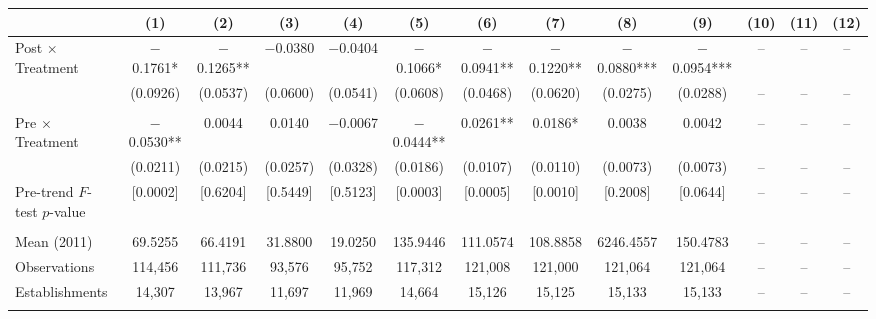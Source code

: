 \documentclass[12pt,letterpaper]{article}
\begin{document}
\begin{table}[]
\begin{threeparttable}
\begin{tabular}{lcccccccccccc}
 & (1) & (2) & (3) & (4) & (5) & (6) & (7) & (8) & (9) & (10) & (11) & (12) \\
\midrule
Post $\times$ Treatment & $-$0.1761* & $-$0.1265** & $-$0.0380 & $-$0.0404 & $-$0.1066* & $-$0.0941** & $-$0.1220** & $-$0.0880*** & $-$0.0954*** & -- & -- & -- \\
  & (0.0926) & (0.0537) & (0.0600) & (0.0541) & (0.0608) & (0.0468) & (0.0620) & (0.0275) & (0.0288) & -- & -- & -- \\
  &  &  &  &  &  &  &  &  &  &  &  & \\
Pre $\times$ Treatment & $-$0.0530** & 0.0044 & 0.0140 & $-$0.0067 & $-$0.0444** & 0.0261** & 0.0186* & 0.0038 & 0.0042 & -- & -- & -- \\
  & (0.0211) & (0.0215) & (0.0257) & (0.0328) & (0.0186) & (0.0107) & (0.0110) & (0.0073) & (0.0073) & -- & -- & -- \\
Pre-trend $F$-test $p$-value & [0.0002] & [0.6204] & [0.5449] & [0.5123] & [0.0003] & [0.0005] & [0.0010] & [0.2008] & [0.0644] & -- & -- & -- \\
  &  &  &  &  &  &  &  &  &  &  &  & \\
Mean (2011) & 69.5255 & 66.4191 & 31.8800 & 19.0250 & 135.9446 & 111.0574 & 108.8858 & 6246.4557 & 150.4783 & -- & -- & -- \\
Observations & 114{,}456 & 111{,}736 & 93{,}576 & 95{,}752 & 117{,}312 & 121{,}008 & 121{,}000 & 121{,}064 & 121{,}064 & -- & -- & -- \\
Establishments & 14{,}307 & 13{,}967 & 11{,}697 & 11{,}969 & 14{,}664 & 15{,}126 & 15{,}125 & 15{,}133 & 15{,}133 & -- & -- & -- \\
  &  &  &  &  &  &  &  &  &  &  &  & \\
\midrule

\end{tabular}
\end{threeparttable}
\end{table}
\end{document}
